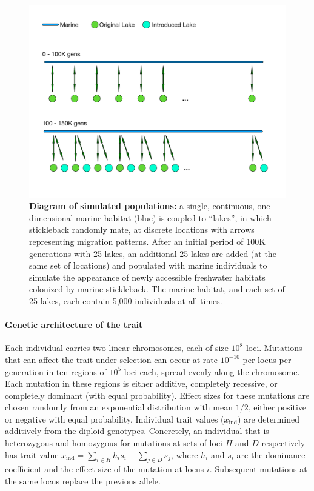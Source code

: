 \documentclass{article}
\begin{document}
\begin{figure}
    \begin{center}
          \includegraphics[width=0.8\linewidth]{Final_Plots/GeographyFigure.pdf}
          \caption{
            \textbf{Diagram of simulated populations:}
            a single, continuous, one-dimensional marine habitat (blue)
            is coupled to ``lakes'', in which stickleback randomly mate, at discrete locations with arrows representing migration patterns.
            After an initial period of 100K generations with 25 lakes,
            an additional 25 lakes are added (at the same set of locations) and populated with marine individuals
            to simulate the appearance of newly accessible freshwater habitats colonized by marine stickleback.
            The marine habitat, and each set of 25 lakes, each contain 5,000 individuals at all times.
            }
          \label{fig:Geo}
    \end{center}
\end{figure}

\paragraph{Genetic architecture of the trait}

Each individual carries two linear chromosomes, each of size $10^8$ loci. 
Mutations that can affect the trait under selection can occur at rate $10^{-10}$ per locus per generation in ten regions of $10^5$ loci each, spread evenly along the chromosome. 
Each mutation in these regions is either additive, completely recessive, or completely dominant (with equal probability). 
Effect sizes for these mutations are chosen randomly from an exponential distribution with mean $1/2$, either positive or negative with equal probability. 
Individual trait values ($x_\text{ind}$) are determined additively from the diploid genotypes. 
Concretely, an individual that is heterozygous and homozygous for mutations at sets of loci $H$ and $D$ respectively has trait value $x_\text{ind} = \sum_{i \in H} h_i s_i + \sum_{j \in D} s_j$, where $h_i$ and $s_i$ are the dominance coefficient and the effect size of the mutation at locus $i$. Subsequent mutations at the same locus replace the previous allele. 
\end{document}
